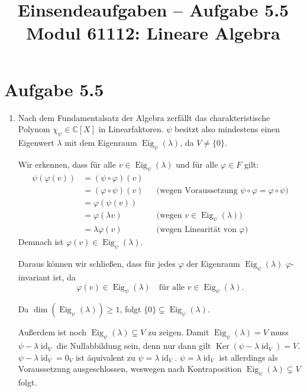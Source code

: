\documentclass[a4paper,12pt]{article}
\title{Einsendeaufgaben -- Aufgabe 5.5\\[0.5em]
\large Modul 61112: Lineare Algebra}
\author{}
\date{}
\begin{document}
\maketitle

\section*{Aufgabe 5.5}

\begin{enumerate}[label=\alph*)]
  \item
  Nach dem Fundamentalsatz der Algebra zerfällt das charakteristische Polynom
  $\chi_\psi \in \mathbb{C}[X]$ in Linearfaktoren. $\psi$ besitzt also
  mindestens einen Eigenwert $\lambda$ mit dem Eigenraum
  $\operatorname{Eig}_\psi(\lambda)$, da $V \neq \{0\}$.

  Wir erkennen, dass für alle $v \in \operatorname{Eig}_\psi(\lambda)$ und für
  alle $\varphi \in F$ gilt:
  \begin{align*}
    \psi(\varphi(v)) &= (\psi \circ \varphi)(v) \\
                     &= (\varphi \circ \psi)(v)
                       && \text{(wegen Voraussetzung } \psi \circ \varphi = \varphi \circ \psi\text{)} \\
                     &= \varphi(\psi(v)) \\
                     &= \varphi(\lambda v)
                       && \text{(wegen } v \in \operatorname{Eig}_\psi(\lambda)\text{)} \\
                     &= \lambda \varphi(v)
                       && \text{(wegen Linearität von } \varphi\text{)}
  \end{align*}
  Demnach ist $\varphi(v) \in \operatorname{Eig}_\psi(\lambda)$.

  Daraus können wir schließen, dass für jedes $\varphi$ der Eigenraum
  $\operatorname{Eig}_\psi(\lambda)$ $\varphi$-invariant ist, da
  \[
    \varphi(v) \in \operatorname{Eig}_\psi(\lambda) \quad \text{für alle }
    v \in \operatorname{Eig}_\psi(\lambda).
  \]

  Da $\dim(\operatorname{Eig}_\psi(\lambda)) \geq 1$, folgt
  $\{0\} \subsetneq \operatorname{Eig}_\psi(\lambda)$.

  Außerdem ist noch $\operatorname{Eig}_\psi(\lambda) \subsetneq V$ zu zeigen.
  Damit $\operatorname{Eig}_\psi(\lambda) = V$ muss $\psi - \lambda \operatorname{id}_V$
  die Nullabbildung sein, denn nur dann gilt $\operatorname{Ker}(\psi - \lambda \operatorname{id}_V) = V$.
  $\psi - \lambda \operatorname{id}_V = 0_V$ ist äquivalent zu
  $\psi = \lambda \operatorname{id}_V$. $\psi = \lambda \operatorname{id}_V$ ist
  allerdings als Voraussetzung ausgeschlossen, weswegen nach Kontraposition
  $\operatorname{Eig}_\psi(\lambda) \subsetneq V$ folgt.


\end{enumerate}
\end{document}
